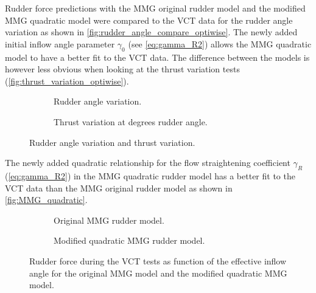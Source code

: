 Rudder force predictions with the MMG original rudder model and the modified MMG quadratic model were compared to the VCT data for the rudder angle variation as shown in \autoref{fig:rudder_angle_compare_optiwise}. The newly added initial inflow angle parameter $\gamma_0$ (see \autoref{eq:gamma_R2}) allows the MMG quadratic  model to have a better fit to the VCT data. The difference between the models is however less obvious when looking at the thrust variation tests (\autoref{fig:thrust_variation_optiwise}).
\begin{figure}[h]
     \centering
     \begin{subfigure}[b]{0.49\textwidth}
         \centering
         
        \caption{Rudder angle variation.}
        \label{fig:rudder_angle_compare_optiwise}
     \end{subfigure}
     \hfill
     \begin{subfigure}[b]{0.49\textwidth}
         \centering
         
        \caption{Thrust variation at  degrees rudder angle.}
        \label{fig:thrust_variation_optiwise}
     \end{subfigure}
    \caption{Rudder angle variation and thrust variation.}
    \label{fig:rudder_angle_compare_optiwise_all}
\end{figure}

The newly added quadratic relationship for the flow straightening coefficient $\gamma_R$ (\autoref{eq:gamma_R2}) in the MMG quadratic rudder model has a better fit to the VCT data than the MMG original rudder model as shown in \autoref{fig:MMG_quadratic}.
\begin{figure}[h]
     \centering
     \begin{subfigure}[b]{0.49\textwidth}
         \centering
         
        \caption{Original MMG rudder model.}
        \label{fig:Y_R_MMG_original}
     \end{subfigure}
     \hfill
     \begin{subfigure}[b]{0.49\textwidth}
         \centering
         
        \caption{Modified quadratic MMG rudder model.}
        \label{fig:Y_R_MMG_quadratic}
     \end{subfigure}
    \caption{Rudder force during the VCT tests as function of the effective inflow angle for the original MMG model and the modified quadratic MMG model.}
    \label{fig:MMG_quadratic}
\end{figure}

